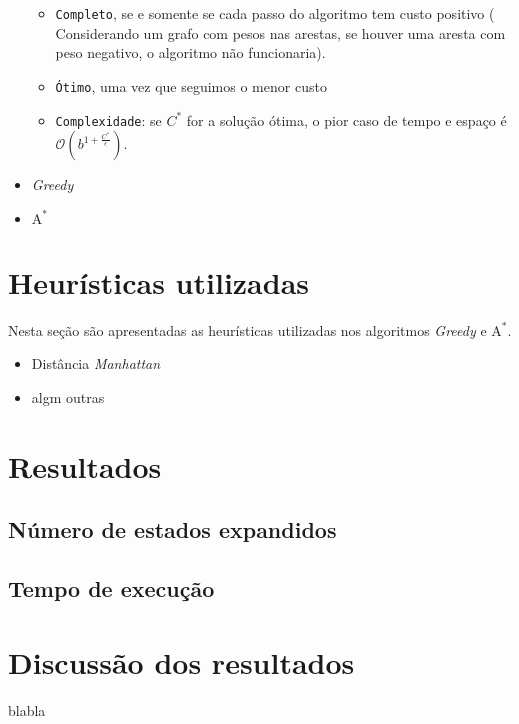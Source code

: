 \documentclass{article}
\begin{document}
\begin{itemize}
		\begin{itemize}
			\item \texttt{Completo}, se e somente se cada passo do algoritmo tem custo positivo (
				Considerando um grafo com pesos nas arestas, se houver uma aresta com peso negativo, o algoritmo
				não funcionaria).
			\item \texttt{Ótimo}, uma vez que seguimos o menor custo
			\item \texttt{Complexidade}: se \(C^*\) for a solução ótima,
				o pior caso de tempo e espaço é \(\mathcal{O}(b^{1 + \frac{C^*}{\epsilon}})\).
		\end{itemize}

	\item \textit{Greedy}

	\item \(\text{A}^*\)


\end{itemize}


\section{Heurísticas utilizadas}

Nesta seção são apresentadas as heurísticas utilizadas nos algoritmos \textit{Greedy} e \(\text{A}^*\).

\begin{itemize}
	\item Distância \textit{Manhattan}
	\item algm outras
\end{itemize}

\section{Resultados}

\subsection{Número de estados expandidos}

\subsection{Tempo de execução}

\section{Discussão dos resultados}

blabla
\end{document}
